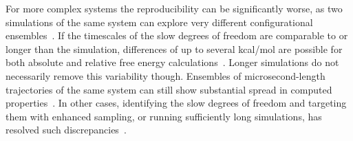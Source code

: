 \documentclass[9pt,bestpractices]{livecoms}
\begin{document}


For more complex systems the reproducibility can be significantly worse, as two simulations of the same system can explore very different configurational ensembles~\cite{lim2016sensitivity, suruzhon2021sensitivity, bhati2018, bhati2019, wan2021uq, vassaux2021}. If the timescales of the slow degrees of freedom are comparable to or longer than the simulation, differences of up to several kcal/mol are possible for both absolute and relative free energy calculations~\cite{lim2016sensitivity, zhang2023sampling, bhati2023}. Longer simulations do not necessarily remove this variability though. Ensembles of microsecond-length trajectories of the same system can still show substantial
spread in computed properties~\cite{bhati2023}. In other cases, identifying the slow degrees of freedom and targeting them with enhanced sampling, or running sufficiently long simulations, has resolved such discrepancies~\cite{lim2016sensitivity, zhang2023sampling}.
\end{document}
